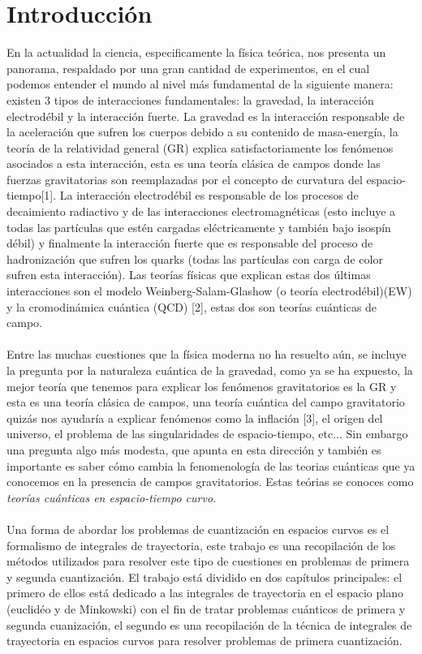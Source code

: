 \chapter{Introducción}
En la actualidad la ciencia, especificamente la física teórica, nos presenta un panorama, respaldado por una gran cantidad de experimentos, en el cual podemos entender el mundo al nivel más fundamental de la siguiente manera: existen 3 tipos de interacciones fundamentales: la gravedad, la interacción electrodébil y la interacción fuerte. La gravedad es la interacción responsable de la aceleración que sufren los cuerpos debido a su contenido de masa-energía, la teoría de la relatividad general (GR) explica satisfactoriamente los fenómenos asociados a esta interacción, esta es una teoría clásica de campos donde las fuerzas gravitatorias son reemplazadas por el concepto de curvatura del espacio-tiempo[1]. La interacción electrodébil es responsable de los procesos de decaimiento radiactivo y de las interacciones electromagnéticas (esto incluye a todas las partículas que estén cargadas eléctricamente y también bajo isospín débil) y finalmente la interacción fuerte que es responsable del proceso de hadronización que sufren los quarks (todas las partículas con carga de color sufren esta interacción). Las teorías físicas que explican estas dos últimas interacciones son el modelo Weinberg-Salam-Glashow (o teoría electrodébil)(EW) y la cromodinámica cuántica (QCD) [2], estas dos son teorías cuánticas de campo.
\\
\\
Entre las muchas cuestiones que la física moderna no ha resuelto aún, se incluye la pregunta por la naturaleza cuántica de la gravedad, como ya se ha expuesto, la mejor teoría que tenemos para explicar los fenómenos gravitatorios es la GR y esta es una teoría clásica de campos, una teoría cuántica del campo gravitatorio quizás nos ayudaría a explicar fenómenos como la inflación [3], el origen del universo, el problema de las singularidades de espacio-tiempo, etc... Sin embargo una pregunta algo más modesta, que apunta en esta dirección y también es importante es saber cómo cambia la fenomenología de las teorias cuánticas que ya conocemos en la presencia de campos gravitatorios. Estas teórias se conoces como \textit{teorías cuánticas en espacio-tiempo curvo.}
\\
\\
Una forma de abordar los problemas de cuantización en espacios curvos es el formalismo de integrales de trayectoria, este trabajo es una recopilación de los métodos utilizados para resolver este tipo de cuestiones en problemas de primera y segunda cuantización. El trabajo está dividido en dos capítulos principales: el primero de ellos está dedicado a las integrales de trayectoria en el espacio plano (euclidéo y de Minkowski) con el fin de tratar problemas cuánticos de primera y segunda cuanización, el segundo es una recopilación de la técnica de integrales de trayectoria en espacios curvos para resolver problemas de primera cuantización.
